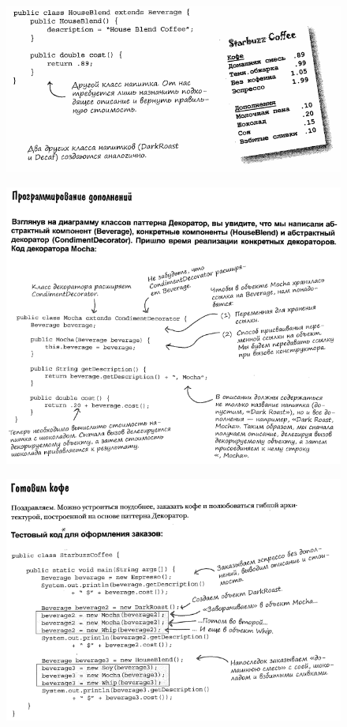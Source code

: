 \documentclass{beamer}
\begin{document}
\begin{frame}
\begin{figure}[h]
\centering
\includegraphics[scale=0.6]{images/lec10-pic21.png}
\label{pic-sort}
\end{figure}
\end{frame}

\begin{frame}
\begin{figure}[h]
\centering
\includegraphics[scale=0.5]{images/lec10-pic22.png}
\label{pic-sort}
\end{figure}
\end{frame}

\begin{frame}
\begin{figure}[h]
\centering
\includegraphics[scale=0.6]{images/lec10-pic23.png}
\label{pic-sort}
\end{figure}
\end{frame}
\end{document}

